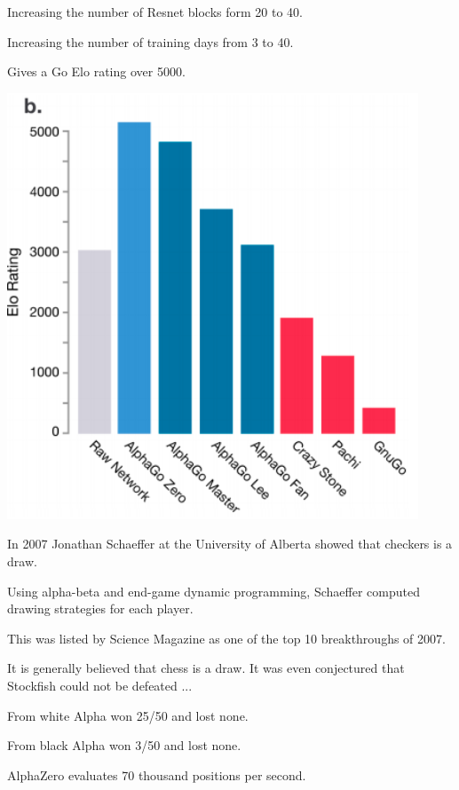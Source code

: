 {

Increasing the number of Resnet blocks form 20 to 40.

\vfill
Increasing the number of training days from 3 to 40.

\vfill
Gives a Go Elo rating over 5000.


\centerline{\includegraphics[height = 5in]{../images/alpha40}}


In 2007 Jonathan Schaeffer at the University of Alberta showed that checkers is a draw.

\vfill
Using alpha-beta and end-game dynamic programming, Schaeffer computed drawing strategies for each player.

\vfill
This was listed by Science Magazine as one of the top 10 breakthroughs of 2007.

\vfill
It is generally believed that chess is a draw.  It was even conjectured that Stockfish could not be defeated ...


From white Alpha won 25/50 and lost none.

\vfill
From black Alpha won 3/50 and lost none.

\vfill
AlphaZero evaluates 70 thousand positions per second.

}
